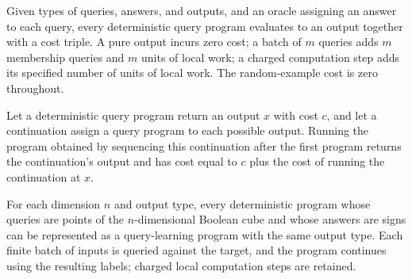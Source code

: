 \begin{definition}
\label{FABL.DeterministicQueryProgram.runWithCost}
\leanok
{}
Given types of queries, answers, and outputs, and an oracle assigning an answer to each
query, every deterministic query program evaluates to an output together with a cost
triple. A pure output incurs zero cost; a batch of $m$ queries adds $m$ membership
queries and $m$ units of local work; a charged computation step adds its specified
number of units of local work. The random-example cost is zero throughout.
\end{definition}

\begin{theorem}
\label{FABL.DeterministicQueryProgram.runWithCost_bind}
\leanok
{}
Let a deterministic query program return an output $x$ with cost $c$, and let a
continuation assign a query program to each possible output. Running the program
obtained by sequencing this continuation after the first program returns the
continuation's output and has cost equal to $c$ plus the cost of running the
continuation at $x$.
\end{theorem}

\begin{definition}
\label{FABL.DeterministicQueryProgram.toLearningProgram}
\leanok
{}
For each dimension $n$ and output type, every deterministic program whose queries are
points of the $n$-dimensional Boolean cube and whose answers are signs can be
represented as a query-learning program with the same output type. Each finite batch of
inputs is queried against the target, and the program continues using the resulting
labels; charged local computation steps are retained.
\end{definition}

